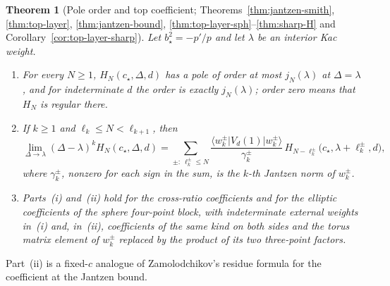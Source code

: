\documentclass[twoside,10pt]{article}
\numberwithin{equation}{section}
\theoremstyle{slbody}
\newtheorem{introtheorem}{Theorem}
\theoremstyle{definition}
\theoremstyle{remark}
\begin{document}
\begin{introtheorem}[Pole order and top coefficient;
Theorems~\ref{thm:jantzen-smith}, \ref{thm:top-layer},
\ref{thm:jantzen-bound}, \ref{thm:top-layer-sph}--\ref{thm:sharp-H} and
Corollary~\ref{cor:top-layer-sharp}]\label{thm:intro-top}
Let \(b_\star^2=-p'/p\) and let \(\lambda\) be an interior Kac weight.
\begin{enumerate}\setlength{\itemsep}{1pt}\setlength{\topsep}{3pt}
\item[(i)] For every \(N\geq1\), \(H_N(c_\star,\Delta,d)\) has a pole of
  order at most \(j_N(\lambda)\) at \(\Delta=\lambda\), and for indeterminate
  \(d\) the order is exactly \(j_N(\lambda)\); order zero means that
  \(H_N\) is regular there.
\item[(ii)] If \(k\geq1\) and \(\ell_k\leq N<\ell_{k+1}\), then
  \begin{equation}\label{eq:intro-top}
   \lim_{\Delta\to\lambda}(\Delta-\lambda)^kH_N(c_\star,\Delta,d)
   =\sum_{\pm:\ \ell^\pm_k\leq N}
   \frac{\langle w^\pm_k|V_d(1)|w^\pm_k\rangle}{\gamma^\pm_k}\,
   H_{N-\ell^\pm_k}\bigl(c_\star,\lambda+\ell^\pm_k,d\bigr),
  \end{equation}
  where \(\gamma^\pm_k\), nonzero for each sign in the sum, is the \(k\)-th
  Jantzen norm of \(w^\pm_k\).
\item[(iii)] Parts~(i) and~(ii) hold for the cross-ratio coefficients and
  for the elliptic coefficients of the sphere four-point block, with
  indeterminate external weights in~(i) and, in~(ii), coefficients of the
  same kind on both sides and the torus matrix element of \(w^\pm_k\)
  replaced by the product of its two three-point factors.
\end{enumerate}
\end{introtheorem}

Part~(ii) is a fixed-\(c\) analogue of Zamolodchikov's residue formula for
the coefficient at the Jantzen bound.
\end{document}
